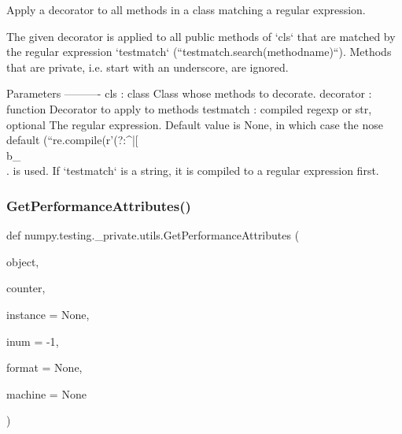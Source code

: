\begin{DoxyVerb}Apply a decorator to all methods in a class matching a regular expression.

The given decorator is applied to all public methods of `cls` that are
matched by the regular expression `testmatch`
(``testmatch.search(methodname)``). Methods that are private, i.e. start
with an underscore, are ignored.

Parameters
----------
cls : class
    Class whose methods to decorate.
decorator : function
    Decorator to apply to methods
testmatch : compiled regexp or str, optional
    The regular expression. Default value is None, in which case the
    nose default (``re.compile(r'(?:^|[\\b_\\.%
    is used.
    If `testmatch` is a string, it is compiled to a regular expression
    first.\end{DoxyVerb}
 \mbox{\label{namespacenumpy_1_1testing_1_1__private_1_1utils_aa9fa75b68f1990888596f7b60932fc49}} 
\subsubsection{\texorpdfstring{Get\+Performance\+Attributes()}{GetPerformanceAttributes()}}
{\footnotesize\ttfamily def numpy.\+testing.\+\_\+private.\+utils.\+Get\+Performance\+Attributes (\begin{DoxyParamCaption}\item[{}]{object,  }\item[{}]{counter,  }\item[{}]{instance = {\ttfamily None},  }\item[{}]{inum = {\ttfamily -\/1},  }\item[{}]{format = {\ttfamily None},  }\item[{}]{machine = {\ttfamily None} }\end{DoxyParamCaption})}

\mbox{\label{namespacenumpy_1_1testing_1_1__private_1_1utils_a760e65e6b10227d9e769e4389ddd88cf}} 
